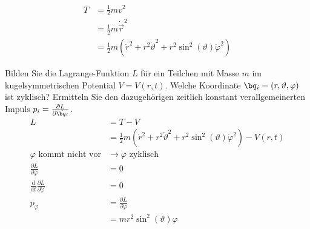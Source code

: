 \begin{enumeralph}
\begin{enumeroman}
	\begin{align*}
		T&=\frac{1}{2}mv^2\\
		&=\frac{1}{2}m\dot{\overrightarrow{r}}^2\\
		&=\frac{1}{2}m(\dot{r}^2+r^2\dot{\vartheta}^2+r^2\sin^2(\vartheta)\dot{\varphi}^2)
	\end{align*}
	\end{enumeroman}
\item Bilden Sie die Lagrange-Funktion $L$ für ein Teilchen mit Masse $m$ im kugelsymmetrischen Potential $V=V(r,t)$. Welche Koordinate $\q_i= (r,\vartheta,\varphi)$ ist zyklisch? Ermitteln Sie den dazugehörigen zeitlich konstant verallgemeinerten Impuls $p_i=\frac{\partial L}{\partial\dot{\q_i}}$.
\begin{align*}
L&=T-V\\
&=\frac{1}{2}m(\dot{r}^2+r^2\dot{\vartheta}^2+r^2\sin^2(\vartheta)\dot{\varphi}^2)-V(r,t)\\
\text{$\varphi$ kommt nicht vor}&\rightarrow\text{$\varphi$ zyklisch}\\
\frac{\partial L}{\partial\varphi}&=0\\
\frac{\mathrm{d}}{\mathrm{d}t}\frac{\partial L}{\partial\dot{\varphi}}&=0\\
p_\varphi&=\frac{\partial L}{\partial\dot{\varphi}}\\
&=mr^2\sin^2(\vartheta)\varphi\\
\end{align*}
\end{enumeralph}
 
